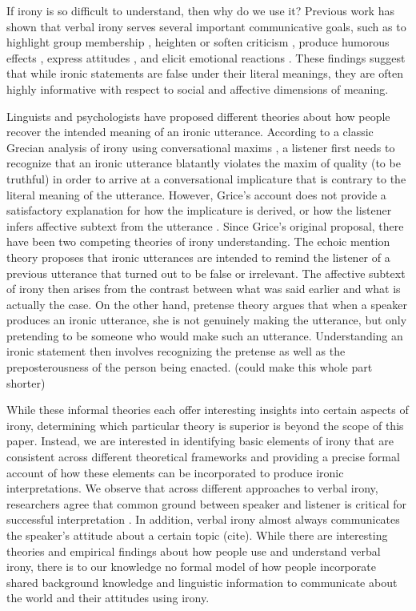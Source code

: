 \documentclass[10pt,letterpaper]{article}
\begin{document}
If irony is so difficult to understand, then why do we use it? Previous work has shown that verbal irony serves several important communicative goals, such as to highlight group membership \cite{gibbs2000irony}, heighten or soften criticism \cite{colston1997salting}, produce humorous effects \cite{roberts1994people}, express attitudes \cite{colston1998you, colston1997ve}, and elicit emotional reactions \cite{leggitt2000emotional}. These findings suggest that while ironic statements are false under their literal meanings, they are often highly informative with respect to social and affective dimensions of meaning. 

Linguists and psychologists have proposed different theories about how people recover the intended meaning of an ironic utterance. According to a classic Grecian analysis of irony using conversational maxims \cite{grice20134, wilson2006pragmatics}, a listener first needs to recognize that an ironic utterance blatantly violates the maxim of quality (to be truthful) in order to arrive at a conversational implicature that is contrary to the literal meaning of the utterance. However, Grice's account does not provide a satisfactory explanation for how the implicature is derived, or how the listener infers affective subtext from the utterance \cite{wilson2006pragmatics}. Since Grice's original proposal, there have been two competing theories of irony understanding. The echoic mention theory \cite{sperber1981irony, jorgensen1984test} proposes that ironic utterances are intended to remind the listener of a previous utterance that turned out to be false or irrelevant. The affective subtext of irony then arises from the contrast between what was said earlier and what is actually the case. On the other hand, pretense theory \cite{clark1984pretense} argues that when a speaker produces an ironic utterance, she is not genuinely making the utterance, but only pretending to be someone who would make such an utterance. Understanding an ironic statement then involves recognizing the pretense as well as the preposterousness of the person being enacted. (could make this whole part shorter) 

While these informal theories each offer interesting insights into certain aspects of irony, determining which particular theory is superior is beyond the scope of this paper. Instead, we are interested in identifying basic elements of irony that are consistent across different theoretical frameworks and providing a precise formal account of how these elements can be incorporated to produce ironic interpretations. We observe that across different approaches to verbal irony, researchers agree that common ground between speaker and listener is critical for successful interpretation \cite{williams1984does}. In addition, verbal irony almost always communicates the speaker's attitude about a certain topic (cite). While there are interesting theories and empirical findings about how people use and understand verbal irony, there is to our knowledge no formal model of how people incorporate shared background knowledge and linguistic information to communicate about the world and their attitudes using irony.
\end{document}
